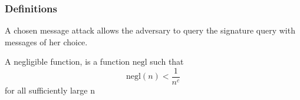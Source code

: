\begin{frame}
	\frametitle{Definitions}

	\begin{definition}
    A chosen message attack allows the adversary to query the signature query with messages of her choice.
  \end{definition}
    
  \begin{definition}
    A negligible function, is a function $\mathrm{negl}$ such that
      \[ \mathrm{negl}(n) < \frac{1}{n^c} \]
    for all sufficiently large n
	\end{definition}
\end{frame}